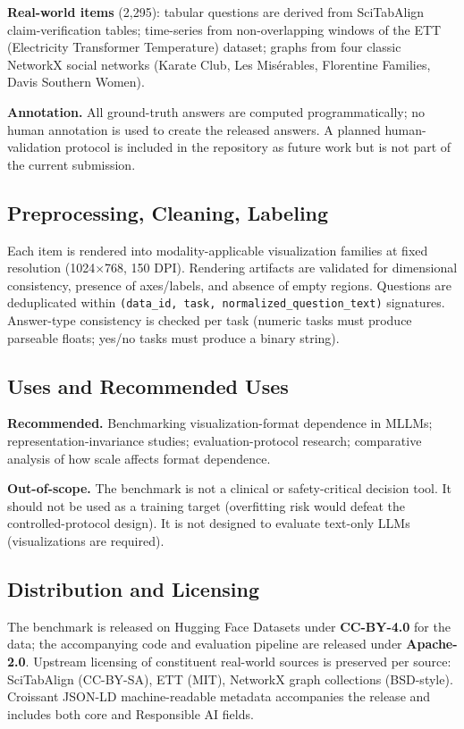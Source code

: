 \documentclass{article}
\begin{document}
\textbf{Real-world items} (2{,}295): tabular questions are derived from SciTabAlign claim-verification tables; time-series from non-overlapping windows of the ETT (Electricity Transformer Temperature) dataset; graphs from four classic NetworkX social networks (Karate Club, Les Mis\'{e}rables, Florentine Families, Davis Southern Women).

\textbf{Annotation.} All ground-truth answers are computed programmatically; no human annotation is used to create the released answers. A planned human-validation protocol is included in the repository as future work but is not part of the current submission.

\subsection{Preprocessing, Cleaning, Labeling}
Each item is rendered into modality-applicable visualization families at fixed resolution (1024$\times$768, 150 DPI). Rendering artifacts are validated for dimensional consistency, presence of axes/labels, and absence of empty regions. Questions are deduplicated within \texttt{(data\_id, task, normalized\_question\_text)} signatures. Answer-type consistency is checked per task (numeric tasks must produce parseable floats; yes/no tasks must produce a binary string).

\subsection{Uses and Recommended Uses}
\textbf{Recommended.} Benchmarking visualization-format dependence in MLLMs; representation-invariance studies; evaluation-protocol research; comparative analysis of how scale affects format dependence.

\textbf{Out-of-scope.} The benchmark is not a clinical or safety-critical decision tool. It should not be used as a training target (overfitting risk would defeat the controlled-protocol design). It is not designed to evaluate text-only LLMs (visualizations are required).

\subsection{Distribution and Licensing}
The benchmark is released on Hugging Face Datasets under \textbf{CC-BY-4.0} for the data; the accompanying code and evaluation pipeline are released under \textbf{Apache-2.0}. Upstream licensing of constituent real-world sources is preserved per source: SciTabAlign (CC-BY-SA), ETT (MIT), NetworkX graph collections (BSD-style). Croissant JSON-LD machine-readable metadata accompanies the release and includes both core and Responsible AI fields.
\end{document}
